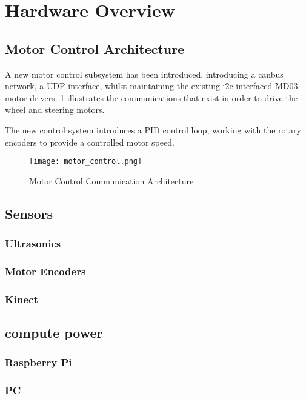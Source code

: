 \section{Hardware Overview}

\subsection{Motor Control Architecture}
A new motor control subsystem has been introduced, introducing a \gls{canbus} network, a \gls{UDP} interface, whilst maintaining the existing \gls{i2c} interfaced MD03 motor drivers. \ref{fig:motor-control-architecture} illustrates the communications that exist in order to drive the wheel and steering motors.

The new control system introduces a PID control loop, working with the rotary encoders to provide a controlled motor speed.


\begin{figure}[!htb]
\begin{center}
\texttt{[image: motor\_control.png]}
\end{center}
\caption{Motor Control Communication Architecture}
\label{fig:motor-control-architecture}
\end{figure}

\subsection{Sensors}
\subsubsection{Ultrasonics}
\subsubsection{Motor Encoders}
\subsubsection{Kinect}


\subsection{compute power}
\subsubsection{Raspberry Pi}
\subsubsection{PC}
